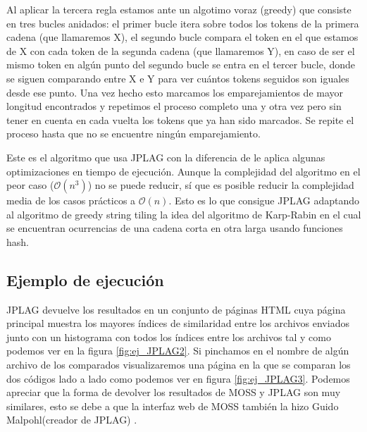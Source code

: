 \bigskip
Al aplicar la tercera regla estamos ante un algotimo voraz (greedy) que consiste en tres bucles anidados: el primer bucle itera sobre todos los tokens de la primera cadena (que llamaremos X), el segundo bucle compara el token en el que estamos de X con cada token de la segunda cadena (que llamaremos Y), en caso de ser el mismo token en algún punto del segundo bucle se entra en el tercer bucle, donde se siguen comparando entre X e Y para ver cuántos tokens seguidos son iguales desde ese punto. 
\newline Una vez hecho esto marcamos los emparejamientos de mayor longitud encontrados y repetimos el proceso completo una y otra vez pero sin tener en cuenta en cada vuelta los tokens que ya han sido marcados.
\newline Se repite el proceso hasta que no se encuentre ningún emparejamiento.  

\bigskip
Este es el algoritmo que usa JPLAG con la diferencia de le aplica algunas optimizaciones en tiempo de ejecución. Aunque la complejidad del algoritmo en el peor caso ($\mathcal{O}(n^3)$) no se puede reducir, sí que es posible reducir la complejidad media de los casos prácticos a $\mathcal{O}(n)$.
\newline
Esto es lo que consigue JPLAG adaptando al algoritmo de greedy string tiling la idea del algoritmo de Karp-Rabin \cite{Rabin} en el cual se encuentran ocurrencias de una cadena corta en otra larga usando funciones hash.


\subsection{Ejemplo de ejecución}
JPLAG devuelve los resultados en un conjunto de páginas HTML cuya página principal muestra los mayores índices de similaridad entre los archivos enviados junto con un histograma con todos los índices entre los archivos tal y como podemos ver en la figura \ref{fig:ej_JPLAG2}.
\newline
Si pinchamos en el nombre de algún archivo de los comparados visualizaremos una página en la que se comparan los dos códigos lado a lado como podemos ver en figura \ref{fig:ej_JPLAG3}.
Podemos apreciar que la forma de devolver los resultados de MOSS y JPLAG son muy similares, esto se debe a que la interfaz web de MOSS también la hizo Guido Malpohl(creador de JPLAG) \cite{moss_credits}.

